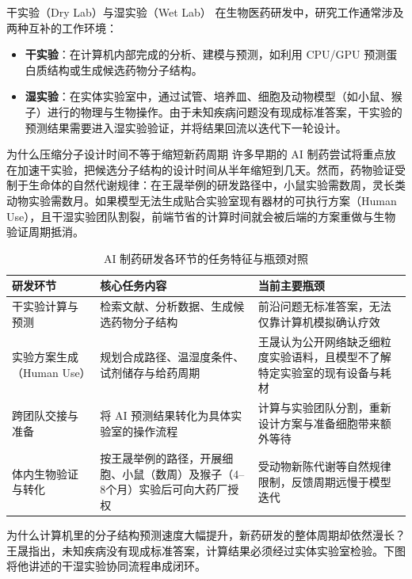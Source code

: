 \documentclass[UTF8,a4paper,11pt,fontset=fandol]{ctexart}
\begin{document}
\begin{knowledgebox}{干实验（Dry Lab）与湿实验（Wet Lab）}
在生物医药研发中，研究工作通常涉及两种互补的工作环境：
\begin{itemize}
\item \textbf{干实验}：在计算机内部完成的分析、建模与预测，如利用 CPU/GPU 预测蛋白质结构或生成候选药物分子结构。
\item \textbf{湿实验}：在实体实验室中，通过试管、培养皿、细胞及动物模型（如小鼠、猴子）进行的物理与生物操作。由于未知疾病问题没有现成标准答案，干实验的预测结果需要进入湿实验验证，并将结果回流以迭代下一轮设计。
\end{itemize}
\end{knowledgebox}
\begin{importantbox}{为什么压缩分子设计时间不等于缩短新药周期}
许多早期的 AI 制药尝试将重点放在加速干实验，把候选分子结构的设计时间从半年缩短到几天。然而，药物验证受制于生命体的自然代谢规律：在王晟举例的研发路径中，小鼠实验需数周，灵长类动物实验需数月。如果模型无法生成贴合实验室现有器材的可执行方案（Human Use），且干湿实验团队割裂，前端节省的计算时间就会被后端的方案重做与生物验证周期抵消。
\end{importantbox}
\begin{table}[H]\centering\small
\caption{AI 制药研发各环节的任务特征与瓶颈对照}
\begin{tabular}{>{\raggedright\arraybackslash}p{\dimexpr(\linewidth-6\tabcolsep)/3\relax}>{\raggedright\arraybackslash}p{\dimexpr(\linewidth-6\tabcolsep)/3\relax}>{\raggedright\arraybackslash}p{\dimexpr(\linewidth-6\tabcolsep)/3\relax}}
\toprule
研发环节 & 核心任务内容 & 当前主要瓶颈\\\midrule
干实验计算与预测 & 检索文献、分析数据、生成候选药物分子结构 & 前沿问题无标准答案，无法仅靠计算机模拟确认疗效\\[4pt]
实验方案生成（Human Use） & 规划合成路径、温湿度条件、试剂储存与给药周期 & 王晟认为公开网络缺乏细粒度实验语料，且模型不了解特定实验室的现有设备与耗材\\[4pt]
跨团队交接与准备 & 将 AI 预测结果转化为具体实验室的操作流程 & 计算与实验团队分割，重新设计方案与准备细胞带来额外等待\\[4pt]
体内生物验证与转化 & 按王晟举例的路径，开展细胞、小鼠（数周）及猴子（4–8个月）实验后可向大药厂授权 & 受动物新陈代谢等自然规律限制，反馈周期远慢于模型迭代\\[4pt]
\bottomrule\end{tabular}\end{table}
为什么计算机里的分子结构预测速度大幅提升，新药研发的整体周期却依然漫长？王晟指出，未知疾病没有现成标准答案，计算结果必须经过实体实验室检验。下图将他讲述的干湿实验协同流程串成闭环。
\end{document}
